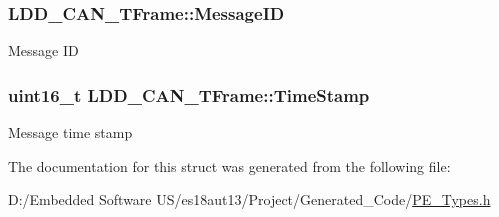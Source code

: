 \subsubsection[{Message\+I\+D}]{ L\+D\+D\+\_\+\+C\+A\+N\+\_\+\+T\+Frame\+::\+Message\+I\+D}\label{struct_l_d_d___c_a_n___t_frame_ab6f347f42b51e9ae318e04cdce84c82c}
Message I\+D \hypertarget{struct_l_d_d___c_a_n___t_frame_a9bab04fefdcfc101f718355bc6e20eb4}{}
\subsubsection[{Time\+Stamp}]{\setlength{\rightskip}{0pt plus 5cm}uint16\+\_\+t L\+D\+D\+\_\+\+C\+A\+N\+\_\+\+T\+Frame\+::\+Time\+Stamp}\label{struct_l_d_d___c_a_n___t_frame_a9bab04fefdcfc101f718355bc6e20eb4}
Message time stamp 

The documentation for this struct was generated from the following file\+:\begin{DoxyCompactItemize}
\item 
D\+:/\+Embedded Software U\+S/es18aut13/\+Project/\+Generated\+\_\+\+Code/\hyperlink{_p_e___types_8h}{P\+E\+\_\+\+Types.\+h}\end{DoxyCompactItemize}
